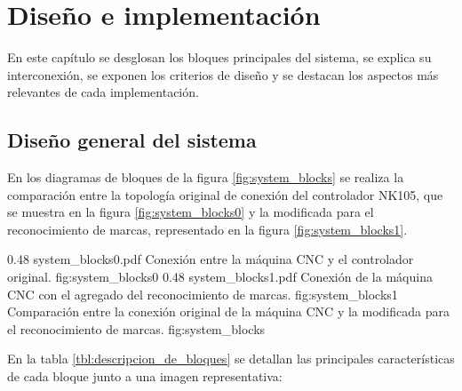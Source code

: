 \chapter{Diseño e implementación} %

\label{Chapter3}

En este capítulo se desglosan los bloques principales del sistema, se explica su interconexión, se exponen los criterios de diseño y se destacan los aspectos más relevantes de cada implementación.

\section{Diseño general del sistema}

En los diagramas de bloques de la figura \ref{fig:system_blocks} se realiza la comparación entre la topología original de conexión del controlador NK105, que se muestra en la figura \ref{fig:system_blocks0} y la modificada para el reconocimiento de marcas, representado en la figura \ref{fig:system_blocks1}.

\subfigab 
        {0.48} {system_blocks0.pdf} {Conexión entre la máquina CNC y el controlador original.} {fig:system_blocks0}
        {0.48} {system_blocks1.pdf} {Conexión de la máquina CNC con el agregado del reconocimiento de marcas.} {fig:system_blocks1}
        {Comparación entre la conexión original de la máquina CNC y la modificada para el reconocimiento de marcas.}
        {fig:system_blocks}

        En la tabla \ref{tbl:descripcion_de_bloques} se detallan las principales características de cada bloque junto a una imagen representativa:


